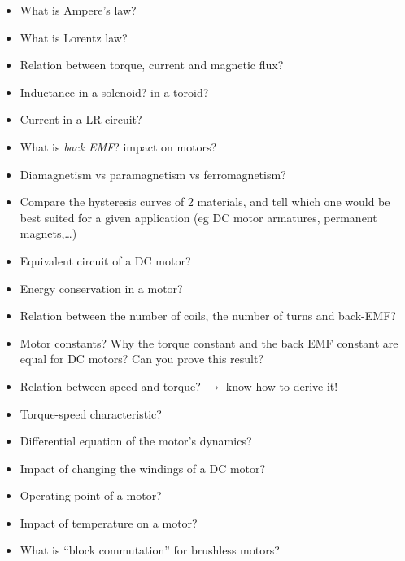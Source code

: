 \documentclass[compress]{beamer}
\begin{document}
\begin{frame}[plain]
    \begin{center}
        \begin{itemize}
        \item {What is Ampere's law?}
        \item {What is Lorentz law?}
        \item Relation between torque, current and magnetic flux?
        \item Inductance in a solenoid? in a toroid?
        \item Current in a LR circuit?
        \item What is \emph{back EMF}? impact on motors?
        \item {Diamagnetism vs paramagnetism vs ferromagnetism?}
        \item {Compare the hysteresis curves of 2 materials, and tell which one would be best suited for a given application (eg DC motor armatures, permanent magnets,…)}
        \end{itemize}
    \end{center}
\end{frame}

\begin{frame}[plain]
    \begin{center}
        \begin{itemize}
        \item {Equivalent circuit of a DC motor?}
        \item Energy conservation in a motor?
        \item {Relation between the number of coils, the number of turns and back-EMF?}
        \item {Motor constants? Why the torque constant and the back EMF constant are equal for DC motors? Can you prove this result?}
        \item {Relation between speed and torque? $\rightarrow$ know how to derive it!}
        \item {Torque-speed characteristic?}
        \item {Differential equation of the motor’s dynamics?}
        \item {Impact of changing the windings of a DC motor?}
        \item {Operating point of a motor?}
        \item {Impact of temperature on a motor?}
        \item {What is “block commutation” for brushless motors?}
        \end{itemize}
    \end{center}
\end{frame}
\end{document}
